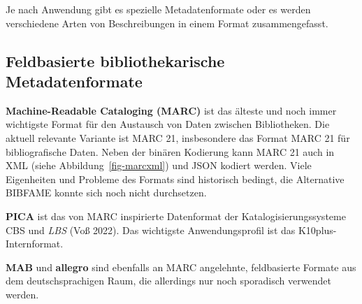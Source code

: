 \documentclass[
  11pt,
  letterpaper,
  DIV=11,
  twoside]{scrreprt}
\begin{document}
Je nach Anwendung gibt es spezielle Metadatenformate oder es werden
verschiedene Arten von Beschreibungen in einem Format zusammengefasst.

\subsection{Feldbasierte bibliothekarische
Metadatenformate}\label{feldbasierte-bibliothekarische-metadatenformate}

\textbf{Machine-Readable Cataloging (MARC)} ist das älteste und noch
immer wichtigste Format für den Austausch von Daten zwischen
Bibliotheken. Die aktuell relevante Variante ist MARC 21, insbesondere
das Format MARC 21 für bibliografische Daten. Neben der binären
Kodierung kann MARC 21 auch in XML (siehe Abbildung~\ref{fig-marcxml})
und JSON kodiert werden. Viele Eigenheiten und Probleme des Formats sind
historisch bedingt, die Alternative BIBFAME konnte sich noch nicht
durchsetzen.

\textbf{PICA} ist das von MARC inspirierte Datenformat der
Katalogisierungssysteme {CBS} und \emph{LBS} (Voß 2022). Das wichtigste
Anwendungsprofil ist das K10plus-Internformat.

\textbf{MAB} und \textbf{allegro} sind ebenfalls an MARC angelehnte,
feldbasierte Formate aus dem deutschsprachigen Raum, die allerdings nur
noch sporadisch verwendet werden.
\end{document}
